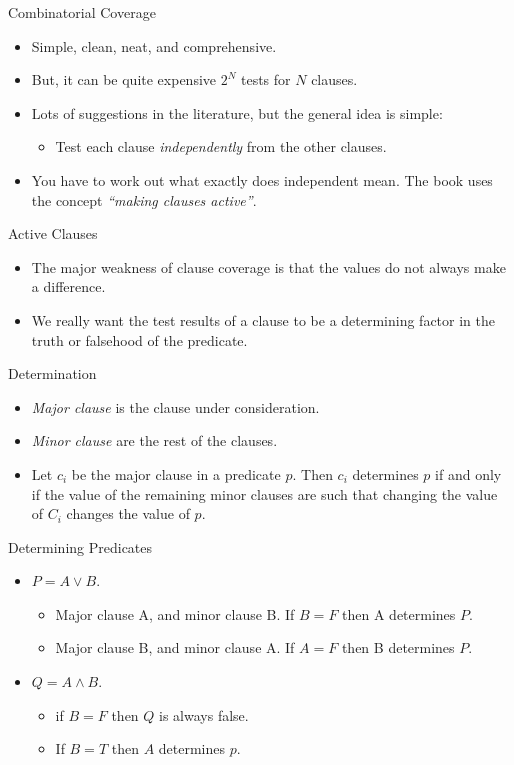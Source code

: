 \documentclass{beamer}
\begin{document}
\begin{frame}{Combinatorial Coverage}
  \begin{itemize}
    \item Simple, clean, neat, and comprehensive.
  \item But, it can be quite expensive $2^N$ tests for $N$ clauses. 
  \item Lots of suggestions in the literature, but the general idea is
    simple:
    \begin{itemize}
    \item Test each clause {\em independently} from the other clauses.
    \end{itemize}
  \item You have to work out what exactly does independent mean. The
    book uses the concept {\em ``making clauses active''}.
  \end{itemize}
\end{frame}
\begin{frame}{Active Clauses}
  \begin{itemize}
  \item The major weakness of clause coverage is that the values do
    not always make a difference.
  \item We really want the test results of a clause to be a
    determining factor in the truth or falsehood of the predicate.
  \end{itemize}
  
\end{frame}
\begin{frame}{Determination}
  \begin{itemize}
  \item {\em Major clause}  is the clause under consideration.
  \item {\em Minor clause}  are the rest of the clauses.
  \item Let $c_i$ be the major clause in a predicate $p$. Then
    $c_i$ determines $p$ if and only if the value of the remaining
    minor clauses are such that changing the value of $C_i$ changes
    the value of $p$. 
  \end{itemize}
  
\end{frame}
\begin{frame}{Determining Predicates}

  \begin{itemize}
  \item $P = A \lor B$.
    \begin{itemize}
    \item Major clause A, and minor clause B. If $B=F$ then A determines $P$. 
    \item Major clause B, and minor clause A. If $A=F$ then B determines $P$.
    \end{itemize}
  \item $Q = A \land B$.
    \begin{itemize}
    \item if $B=F$ then $Q$ is always false. 
    \item If $B=T$ then $A$ determines $p$.
    \end{itemize}
  \end{itemize}
  \end{frame}
\end{document}
